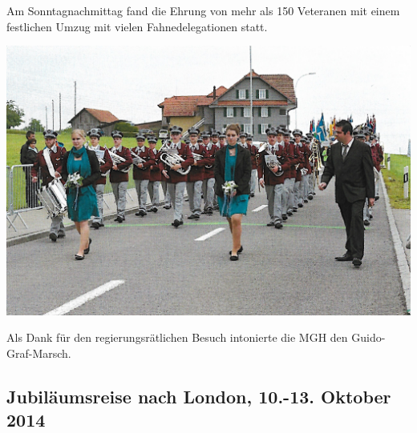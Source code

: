 \begin{history}
    Am Sonntagnachmittag fand die Ehrung von mehr als 150 Veteranen mit einem
    festlichen Umzug mit vielen Fahnedelegationen statt.

    \begin{MulticolFigure}
        \centering
        \includegraphics[width=0.93\linewidth]{./chap/2001-2024/2013/MGH-Umzug.jpg}
    \end{MulticolFigure}

    Als Dank für den regierungsrätlichen Besuch intonierte die MGH den
    Guido-Graf-Marsch.

\end{history}

\subsection*{Jubiläumsreise nach London, 10.-13. Oktober 2014}

